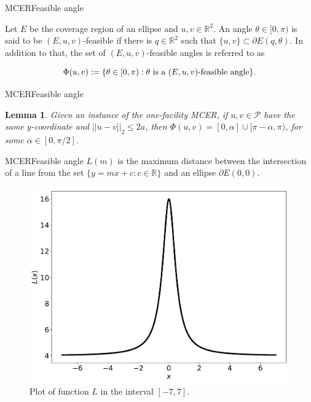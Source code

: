 \documentclass{beamer}
\newcommand{\R}{\mathbb{R}}
\newcommand{\Pp}{\mathscr{P}}
\newtheorem{lem}{Lemma}
\theoremstyle{definition}
\begin{document}
\begin{frame}{MCER}{Feasible angle}
	\begin{definition}\label{def:feasible_angle}
		Let $E$ be the coverage region of an ellipse and $u, v \in \R^2$. An angle $\theta \in [0, \pi)$ is said to be $(E, u, v)$-feasible if there is $q \in \R^2$ such that $\{u, v\} \subset \partial E(q, \theta)$.
		In addition to that, the set of $(E, u, v)$-feasible angles is referred to as 
		
		\begin{equation*}
		\Phi(u, v) := \{\theta \in [0, \pi) : \theta \textnormal{ is a } (E,u,v)\textnormal{-feasible angle}\}.
		\end{equation*}
	\end{definition}
	
\end{frame}


\begin{frame}{MCER}{Feasible angle}
	\begin{lem}\label{lema:l-function}
		Given an instance of the one-facility MCER, if $u, v \in \Pp$ have the same $y$-coordinate and $||u-v||_2 \le 2a$, then $\Phi(u,v) = [0, \alpha] \cup [\pi - \alpha, \pi)$, for some $\alpha \in [0, \pi/2]$.
	\end{lem}
\end{frame}

\begin{frame}{MCER}{Feasible angle}
	$L(m)$ is the maximum distance between the intersection of a line from the set $\{y=mx + c \colon c \in \R\}$ and an ellipse $\partial E(0, 0)$.
	\begin{figure}[H]
	\centering
		\includegraphics[scale=.26]{../tex/figures/L-function-plot}
		\caption{Plot of function $L$ in the interval $[-7, 7]$.}
		\label{fig:L-function-plot}
	\end{figure}
\end{frame}
\end{document}
